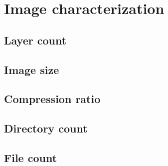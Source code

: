 \section{Image characterization}
\label{sec:redundant_images}

\subsection{Layer count}

\subsection{Image size}

\subsection{Compression ratio}

\subsection{Directory count}


\subsection{File count}


